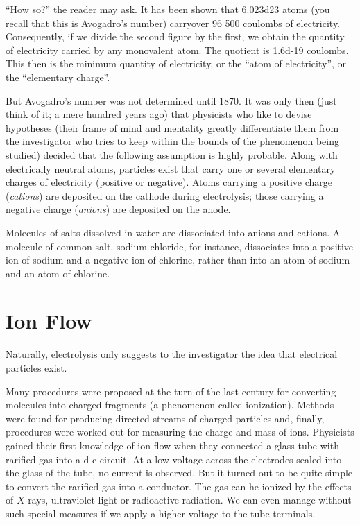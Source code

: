 ``How so?'' the reader may ask. It has been shown that \num{6.023d23} atoms (you recall that this is Avogadro's number) carryover 96 500 coulombs of electricity. Consequently, if we divide the second figure by the first, we obtain the quantity of electricity carried by any monovalent atom. The quotient is \num{1.6d-19} coulombs. This then is the minimum quantity of electricity, or the ``atom of electricity'', or the ``elementary charge''.

But Avogadro's number was not determined until 1870. It was only then (just think of it; a mere hundred years ago) that physicists who like to devise hypotheses (their frame of mind and mentality greatly differentiate them from the investigator who tries to keep within the bounds of the phenomenon being studied) decided that the following assumption is highly probable. Along with electrically neutral atoms, particles exist that carry one or several elementary charges of electricity (positive or negative). Atoms carrying a positive charge (\emph{cations}) are deposited on the cathode during electrolysis; those carrying a negative charge (\emph{anions}) are deposited on the anode.

Molecules of salts dissolved in water are dissociated into anions and cations. A molecule of common salt, sodium chloride, for instance, dissociates into a positive ion of sodium and a negative ion of chlorine, rather than into an atom of sodium and an atom of chlorine.
 
\section{Ion Flow}
Naturally, electrolysis only suggests to the investigator the idea that electrical particles exist.

Many procedures were proposed at the turn of the last century for converting molecules into charged fragments (a phenomenon called ionization). Methods were found for producing directed streams of charged particles and, finally, procedures were worked out for measuring the charge and mass of ions. Physicists gained their first knowledge of ion flow when they connected a glass tube with rarified gas into a d-c circuit. At a low voltage across the electrodes sealed into the glass of the tube, no current is observed. But it turned out to be quite simple to convert the rarified gas into a conductor. The gas can he ionized by the effects of $X$-rays, ultraviolet light or radioactive radiation. We can even manage without such special measures if we apply a higher voltage to the tube terminals.

